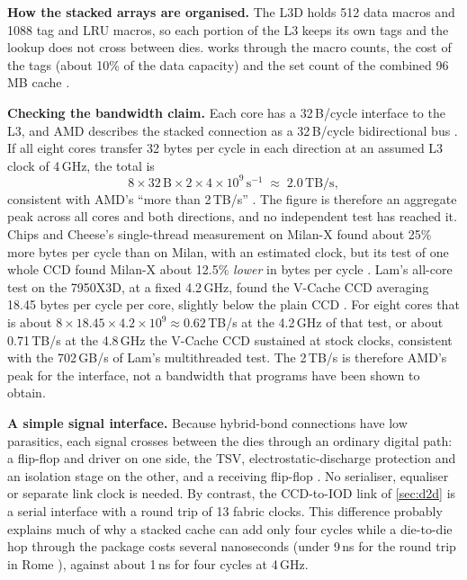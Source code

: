 \textbf{How the stacked arrays are organised.} The L3D holds 512 data macros and 1088 tag and LRU macros, so each portion of the L3 keeps its own tags and the lookup does not cross between dies.  works through the macro counts, the cost of the tags (about 10\% of the data capacity) and the set count of the combined 96\,MB cache \cite[slides~20, 25]{wuu2022vcache}.

\textbf{Checking the bandwidth claim.} Each core has a 32\,B/cycle interface to the L3, and AMD describes the stacked connection as a 32\,B/cycle bidirectional bus \cite[slides~20--21]{wuu2022vcache}. If all eight cores transfer 32 bytes per cycle in each direction at an assumed L3 clock of 4\,GHz, the total is
\[
  8 \times 32\,\text{B} \times 2 \times 4 \times 10^{9}\,\text{s}^{-1} \;\approx\; 2.0\,\text{TB/s},
\]
consistent with AMD's ``more than 2\,TB/s'' \cite[slide~20]{wuu2022vcache}. The figure is therefore an aggregate peak across all cores and both directions, and no independent test has reached it. Chips and Cheese's single-thread measurement on Milan-X found about 25\% more bytes per cycle than on Milan, with an estimated clock, but its test of one whole CCD found Milan-X about 12.5\% \emph{lower} in bytes per cycle \cite{cozmaDeepDivingZen2022}. Lam's all-core test on the 7950X3D, at a fixed 4.2\,GHz, found the V-Cache CCD averaging 18.45 bytes per cycle per core, slightly below the plain CCD \cite{lamAMDs7950X3DZen2023}. For eight cores that is about $8 \times 18.45 \times 4.2 \times 10^{9} \approx 0.62$\,TB/s at the 4.2\,GHz of that test, or about 0.71\,TB/s at the 4.8\,GHz the V-Cache CCD sustained at stock clocks, consistent with the 702\,GB/s of Lam's multithreaded test. The 2\,TB/s is therefore AMD's peak for the interface, not a bandwidth that programs have been shown to obtain.

\textbf{A simple signal interface.} Because hybrid-bond connections have low parasitics, each signal crosses between the dies through an ordinary digital path: a flip-flop and driver on one side, the TSV, electrostatic-discharge protection and an isolation stage on the other, and a receiving flip-flop \cite[slide~26]{wuu2022vcache}. No serialiser, equaliser or separate link clock is needed. By contrast, the CCD-to-IOD link of \cref{sec:d2d} is a serial interface with a round trip of 13 fabric clocks. This difference probably explains much of why a stacked cache can add only four cycles while a die-to-die hop through the package costs several nanoseconds (under 9\,ns for the round trip in Rome \cite{naffziger2020chiplet}), against about 1\,ns for four cycles at 4\,GHz.

